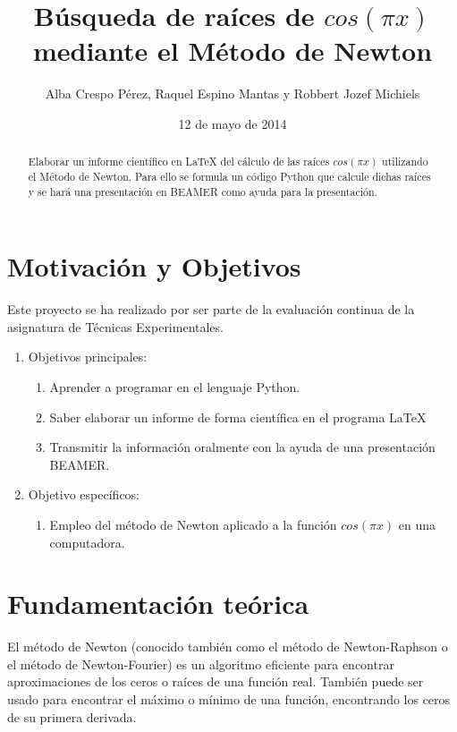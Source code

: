 \documentclass[a4paper,10pt]{article}
\begin{document}
\title{Búsqueda de raíces de  $cos({\pi}x)$ mediante el Método de Newton}
\author{Alba Crespo Pérez, Raquel Espino Mantas y Robbert Jozef Michiels}
\date{12 de mayo de 2014}

\maketitle

\newpage

\begin{abstract}
Elaborar un informe científico en \LaTeX{} del cálculo de las raíces $cos({\pi}x)$ utilizando el Método de Newton. Para ello se formula un código Python que calcule dichas raíces y se hará una presentación en BEAMER como ayuda para la presentación.
\end{abstract}
\newpage
\section{Motivación y Objetivos}
Este proyecto se ha realizado por ser parte de la evaluación continua de la asignatura de Técnicas Experimentales.
\begin{enumerate}
  \item
    Objetivos principales:
      \begin{enumerate}
        \item
          Aprender a programar en el lenguaje Python.
        \item
          Saber elaborar un informe de forma científica en el programa \LaTeX 
        \item
          Transmitir la información oralmente con la ayuda de una presentación BEAMER. 
       \end{enumerate}
  \item
    Objetivo específicos:
       \begin{enumerate}
          \item
           Empleo del método de Newton aplicado a la función $cos({\pi}x)$ en una computadora.
       \end{enumerate}
\end{enumerate}

\newpage

\section{Fundamentación teórica}
El método de Newton (conocido también como el método de Newton-Raphson o el método de Newton-Fourier) es un algoritmo eficiente para encontrar aproximaciones de los ceros o raíces de una función real. También puede ser usado para encontrar el máximo o mínimo de una función, encontrando los ceros de su primera derivada.
\end{document}
